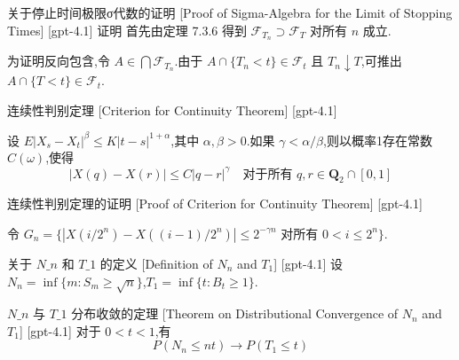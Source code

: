 \documentclass[UTF8]{ctexart}
\begin{document}
    \begin{prf}
        {关于停止时间极限σ代数的证明}
        [Proof of Sigma-Algebra for the Limit of Stopping Times]
        [gpt-4.1]
        证明 首先由定理 7.3.6 得到 $\mathcal{F}_{T_n} \supset \mathcal{F}_T$ 对所有 $n$ 成立.

为证明反向包含,令 $A \in \bigcap \mathcal{F}_{T_n}$.由于 $A \cap \{ T_n < t \} \in \mathcal{F}_t$ 且 $T_n \downarrow T$,可推出 $A \cap \{ T < t \} \in \mathcal{F}_t$.

    \end{prf}
    
    
    
    \begin{thm}
        {连续性判别定理}
        [Criterion for Continuity Theorem]
        [gpt-4.1]
        
设 $E|X_s - X_t|^\beta \leq K|t-s|^{1+\alpha}$,其中 $\alpha, \beta > 0$.如果 $\gamma < \alpha/\beta$,则以概率1存在常数 $C(\omega)$,使得
\[
|X(q) - X(r)| \leq C |q - r|^\gamma \quad \text{对于所有 } q, r \in \mathbf{Q}_2 \cap [0, 1]
\]

    \end{thm}
    
    
    
    \begin{prf}
        {连续性判别定理的证明}
        [Proof of Criterion for Continuity Theorem]
        [gpt-4.1]
        
令 $G_n = \{ |X(i/2^n) - X((i-1)/2^n)| \leq 2^{-\gamma n}$ 对所有 $0 < i \leq 2^n \}$.

    \end{prf}
    
    
    
    \begin{dfn}
        {关于 $N\_{ n }$ 和 $T\_{ 1 }$ 的定义}
        [Definition of $N_{ n }$ and $T_{ 1 }$]
        [gpt-4.1]
        设 $N_{ n } = \inf \{ m : S_{ m } \geq \sqrt{ n } \}$,$T_{ 1 } = \inf \{ t : B_{ t } \geq 1 \}$.
    \end{dfn}
    
    
    
    \begin{thm}
        {$N\_{ n }$ 与 $T\_{ 1 }$ 分布收敛的定理}
        [Theorem on Distributional Convergence of $N_{ n }$ and $T_{ 1 }$]
        [gpt-4.1]
        对于 $0 < t < 1$,有
\[
P( N_{ n } \leq n t ) \to P( T_{ 1 } \leq t )
\]

    \end{thm}
    
\end{document}
